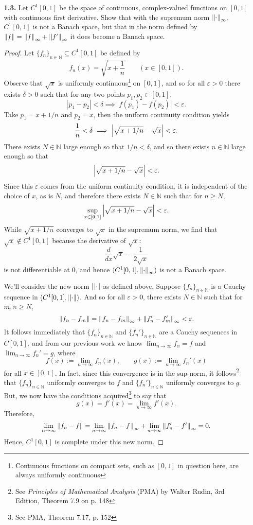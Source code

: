 \documentclass[12pt]{article}
\theoremstyle{definition}
\begin{document}
	\newpage 
	\noindent \textbf{1.3.} Let $C^1[0, 1]$ be the space of continuous, complex-valued functions on $[0, 1]$ with continuous first derivative. Show that with the supremum norm $\norm{\cdot}_\infty$, $C^1[0, 1]$ is not a Banach space, but that in the norm defined by $\norm{f} = \norm{f}_\infty + \norm{f'}_\infty$ it does become a Banach space. 
		\begin{proof}
			Let $\{f_n\}_{n \in \mathbb{N}} \subseteq C^1[0, 1]$ be defined by $$f_n(x) = \sqrt{x + \frac{1}{n}} \qquad (x \in [0, 1]).$$ Observe that $\sqrt{x}$ is uniformly continuous\footnote{Continuous functions on compact sets, such as $[0, 1]$ in question here, are always uniformly continuous} on $[0, 1]$, and so for all $\varepsilon > 0$ there exists $\delta > 0$ such that for any two points $p_1, p_2 \in [0, 1]$, $$|p_1 - p_2| < \delta \implies |f(p_1) - f(p_2)| < \varepsilon.$$  Take $p_1 = x + 1/n$ and $p_2 = x$, then the uniform continuity condition yields $$\frac{1}{n} < \delta \implies \abs{\sqrt{x + 1/n} - \sqrt{x}} < \varepsilon.$$ There exists $N \in \mathbb{N}$ large enough so that $1/n < \delta$, and so there exists $n \in \mathbb{N}$ large enough so that $$\abs{\sqrt{x + 1/n} - \sqrt{x}} < \varepsilon.$$ Since this $\varepsilon$ comes from the uniform continuity condition, it is independent of the choice of $x$, as is $N$, and therefore there exists $N \in \mathbb{N}$ such that for $n \geq N$, $$\sup_{x \in [0, 1]} \abs{\sqrt{x + 1/n} - \sqrt{x}} < \varepsilon.$$ While $\sqrt{x + 1/n}$ converges to $\sqrt{x}$ in the supremum norm, we find that $\sqrt{x} \notin C^1[0, 1]$ because the derivative of $\sqrt{x}$: $$\frac{d}{dx} \sqrt{x} = \frac{1}{2 \sqrt{x}}$$ is not differentiable at 0, and hence $(C^1[0, 1], \norm{\cdot}_\infty)$ is not a Banach space. 
			
			
			
			We'll consider the new norm $\norm{\cdot}$ as defined above. Suppose $\{f_n\}_{n \in \mathbb{N}}$ is a Cauchy sequence in $(C^1[0, 1], \norm{\cdot})$. And so for all $\varepsilon > 0$, there exists $N \in \mathbb{N}$ such that for $m,n \geq N$, $$\norm{f_n - f_m} = \norm{f_n - f_m}_\infty + \norm{f_n' - f_m'}_\infty < \varepsilon.$$ It follows immediately that $\{f_n\}_{n \in \mathbb{N}}$ and $\{f_n'\}_{n \in \mathbb{N}}$ are a Cauchy sequences in $C[0,1]$, and from our previous work we know $\lim_{n \to \infty} f_n = f$ and $\lim_{n \to \infty} f_n' = g$, where $$f(x) := \lim_{n \to \infty} f_n(x), \qquad g(x) := \lim_{n \to \infty} f_n'(x)$$ for all $x \in [0, 1]$. In fact, since this convergence is in the sup-norm, it follows\footnote{See \textit{Principles of Mathematical Analysis} (PMA) by Walter Rudin, 3rd Edition, Theorem 7.9 on p. 148} that $\{f_n\}_{n \in \mathbb{N}}$ uniformly converges to $f$ and $\{f_n'\}_{n \in \mathbb{N}}$ uniformly converges to $g$. But, we now have the conditions acquired\footnote{See PMA, Theorem 7.17, p. 152} to say that $$g(x) = f'(x) = \lim_{n \to \infty} f'(x).$$ Therefore, $$\lim_{n \to \infty} \norm{f_n - f} = \lim_{n \to \infty} \norm{f_n - f}_\infty + \lim_{n \to \infty} \norm{f_n' - f'}_\infty = 0.$$ Hence, $C^1[0,1]$ is complete under this new norm. 
		\end{proof}
	
\end{document}
